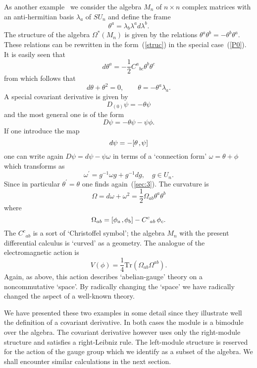 \documentclass[a4paper,12pt]{article}
\def\tr{\mbox{Tr}}
\def\k{\kern-.1em\mathbin{,}\kern-.1em}
\begin{document}
As another example~\cite{DubKerMad89a,Mad89c} we consider the algebra
$M_n$ of $n\times n$ complex matrices with an anti-hermitian basis
$\lambda_a$ of $SU_n$ and define the frame
$$
\theta^a = \lambda_b \lambda^a d \lambda^b.
$$
The structure of the algebra $\Omega^*(M_n)$ is given by the relations
$\theta^a \theta^b = - \theta^b \theta^a$. These relations can be rewritten
in the form~(\ref{struc}) in the special case~(\ref{P0}). It is
easily seen that
$$
d \theta^a = - \frac 12 C^a{}_{bc} \theta^b \theta^c
$$
from which follows that
\begin{equation}
d\theta + \theta^2 = 0,\qquad \theta = - \theta^a\lambda_a.  \label{3.1.14}
\end{equation}
A special covariant derivative is given by
$$
D_{(0)}\psi = - \theta \psi
$$
and the most general one is of the form 
$$
D \psi = - \theta \psi - \psi \phi.
$$
If one introduce the map
\begin{equation}
d\psi = - [\theta\k \psi]                                     \label{3.1.15}
\end{equation}
one can write again $D\psi = d\psi - \psi\omega$ in terms of a 
`connection form' $\omega = \theta + \phi$ which transforms as
$$
\omega^\prime = g^{-1} \omega g + g^{-1} dg, \quad g \in U_n.
$$
Since in particular $\theta^\prime = \theta$ one finds again~(\ref{sec:3}).
The curvature is
$$
\Omega = d\omega + \omega^2 = 
\frac 12 \Omega_{ab} \theta^a \theta^b
$$
where
$$
\Omega_{ab} = [\phi_a\k\phi_b] - C^c{}_{ab}\,\phi_c.
$$
The $C^c{}_{ab}$ is a sort of `Christoffel symbol'; the algebra $M_n$
with the present differential calculus is `curved' as a geometry. The
analogue of the electromagnetic action is
$$
V(\phi) = \frac 14 \tr (\Omega_{ab} \Omega^{ab}).
$$
Again, as above, this action describes `abelian-gauge' theory on a
noncommutative `space'. By radically changing the `space' we have
radically changed the aspect of a well-known theory. 

We have presented these two examples in some detail since they
illustrate well the definition of a covariant derivative. In both
cases the module is a bimodule over the algebra.  The covariant
derivative however uses only the right-module structure and satisfies
a right-Leibniz rule. The left-module structure is reserved for the
action of the gauge group which we identify as a subset of the
algebra. We shall encounter similar calculations in the next section.
\end{document}
